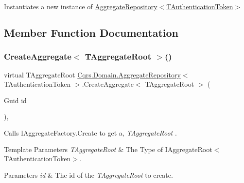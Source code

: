 Instantiates a new instance of \hyperlink{classCqrs_1_1Domain_1_1AggregateRepository_ae4a6c96b10c536a0df6a381659f87744_ae4a6c96b10c536a0df6a381659f87744}{Aggregate\+Repository$<$\+T\+Authentication\+Token$>$} 



\subsection{Member Function Documentation}
\mbox{\label{classCqrs_1_1Domain_1_1AggregateRepository_a64d82c57bbe49a11bd5cf20c5b86ce19_a64d82c57bbe49a11bd5cf20c5b86ce19}} 
\subsubsection{\texorpdfstring{Create\+Aggregate$<$ T\+Aggregate\+Root $>$()}{CreateAggregate< TAggregateRoot >()}}
{\footnotesize\ttfamily virtual T\+Aggregate\+Root \hyperlink{classCqrs_1_1Domain_1_1AggregateRepository}{Cqrs.\+Domain.\+Aggregate\+Repository}$<$ T\+Authentication\+Token $>$.Create\+Aggregate$<$ T\+Aggregate\+Root $>$ (\begin{DoxyParamCaption}\item[{Guid}]{id }\end{DoxyParamCaption})\hspace{0.3cm}{\ttfamily [protected]}, {\ttfamily [virtual]}}



Calls I\+Aggregate\+Factory.\+Create to get a, {\itshape T\+Aggregate\+Root} . 


\begin{DoxyTemplParams}{Template Parameters}
{\em T\+Aggregate\+Root} & The Type of I\+Aggregate\+Root$<$\+T\+Authentication\+Token$>$.\\
\hline
\end{DoxyTemplParams}

\begin{DoxyParams}{Parameters}
{\em id} & The id of the {\itshape T\+Aggregate\+Root}  to create.\\
\hline
\end{DoxyParams}


